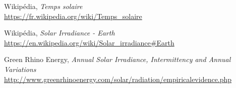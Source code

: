 \documentclass[12pt]{article}
\begin{document}
\begin{thebibliography}{99}
	Wikipédia,
	\emph{Temps solaire}\\
	\url{https://fr.wikipedia.org/wiki/Temps_solaire}
	
	Wikipédia,
	\emph{Solar Irradiance - Earth}\\
	\url{https://en.wikipedia.org/wiki/Solar_irradiance#Earth}
	
	Green Rhino Energy,
	\emph{Annual Solar Irradiance, Intermittency and Annual Variations}\\
	\url{http://www.greenrhinoenergy.com/solar/radiation/empiricalevidence.php}

\end{thebibliography}
\end{document}
